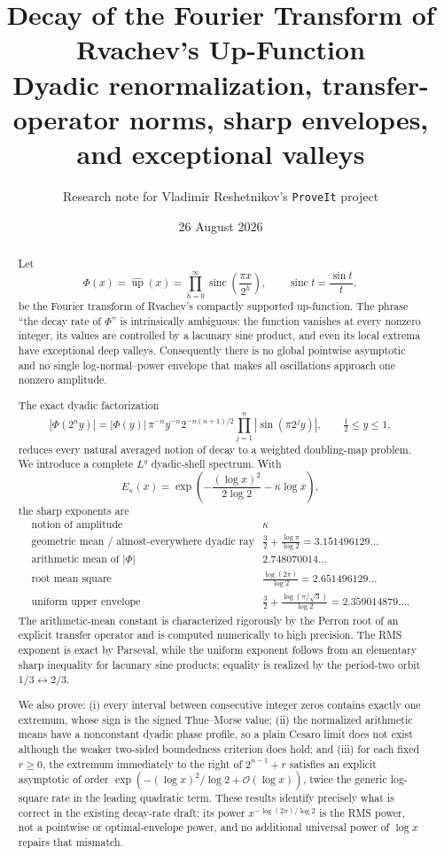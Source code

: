 \documentclass[11pt,oneside]{article}
\title{\bfseries Decay of the Fourier Transform of Rvachev's Up-Function\\[0.35em]
\large Dyadic renormalization, transfer-operator norms, sharp envelopes, and exceptional valleys}
\author{Research note for Vladimir Reshetnikov's \texttt{ProveIt} project}
\date{26 August 2026}
\theoremstyle{definition}
\theoremstyle{remark}
\newcommand{\Up}{\operatorname{up}}
\newcommand{\sinc}{\operatorname{sinc}}
\newcommand{\Phiup}{\Phi}
\newcommand{\bigO}{\mathcal O}
\newcommand{\abs}[1]{\left|#1\right|}
\begin{document}
\maketitle

\begin{abstract}
Let
\[
 \Phiup(x)=\widehat{\Up}(x)
 =\prod_{h=0}^{\infty}\sinc\!\left(\frac{\pi x}{2^h}\right),
 \qquad \sinc t=\frac{\sin t}{t},
\]
be the Fourier transform of Rvachev's compactly supported up-function.  The phrase
``the decay rate of $\Phiup$'' is intrinsically ambiguous: the function vanishes at every
nonzero integer, its values are controlled by a lacunary sine product, and even its local
extrema have exceptional deep valleys.  Consequently there is no global pointwise
asymptotic and no single log-normal--power envelope that makes all oscillations approach
one nonzero amplitude.

The exact dyadic factorization
\[
 \abs{\Phiup(2^n y)}
 =\abs{\Phiup(y)}\,\pi^{-n}y^{-n}2^{-n(n+1)/2}
   \prod_{j=1}^{n}\abs{\sin(\pi 2^j y)},
 \qquad \tfrac12\le y\le1,
\]
reduces every natural averaged notion of decay to a weighted doubling-map problem.  We
introduce a complete $L^q$ dyadic-shell spectrum.  With
\[
 E_\kappa(x)=\exp\!\left(-\frac{(\log x)^2}{2\log2}-\kappa\log x\right),
\]
the sharp exponents are
\[
\begin{array}{c|c}
\text{notion of amplitude}&\kappa\\ \hline
\text{geometric mean / almost-everywhere dyadic ray}
 &\displaystyle \frac32+\frac{\log\pi}{\log2}=3.151496129\ldots\\[0.4em]
\text{arithmetic mean of }\abs{\Phiup}
 &\displaystyle 2.748070014\ldots\\[0.3em]
\text{root mean square}
 &\displaystyle \frac{\log(2\pi)}{\log2}=2.651496129\ldots\\[0.5em]
\text{uniform upper envelope}
 &\displaystyle \frac32+\frac{\log(\pi/\sqrt3)}{\log2}
   =2.359014879\ldots .
\end{array}
\]
The arithmetic-mean constant is characterized rigorously by the Perron root of an explicit
transfer operator and is computed numerically to high precision.  The RMS exponent is
exact by Parseval, while the uniform exponent follows from an elementary sharp inequality
for lacunary sine products; equality is realized by the period-two orbit
$1/3\leftrightarrow2/3$.

We also prove: (i) every interval between consecutive integer zeros contains exactly one
extremum, whose sign is the signed Thue--Morse value; (ii) the normalized arithmetic means
have a nonconstant dyadic phase profile, so a plain Cesaro limit does not exist although the
weaker two-sided boundedness criterion does hold; and (iii) for each fixed $r\ge0$, the
extremum immediately to the right of $2^{n-1}+r$ satisfies an explicit asymptotic of order
$\exp(- (\log x)^2/\log2+\bigO(\log x))$, twice the generic log-square rate in the leading
quadratic term.  These results identify precisely what is correct in the existing decay-rate
draft: its power $x^{-\log(2\pi)/\log2}$ is the RMS power, not a pointwise or optimal-envelope
power, and no additional universal power of $\log x$ repairs that mismatch.
\end{abstract}
\end{document}
